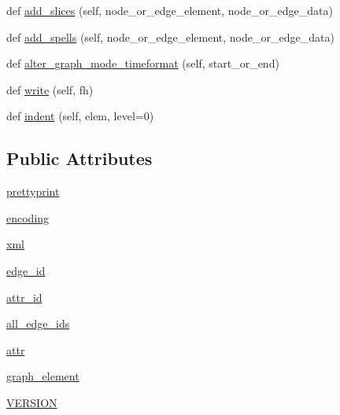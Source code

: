 \begin{DoxyCompactItemize}
\item 
def \hyperlink{classnetworkx_1_1readwrite_1_1gexf_1_1GEXFWriter_adbc9344dbd35d4f1442076ed2bca2ef8}{add\+\_\+slices} (self, node\+\_\+or\+\_\+edge\+\_\+element, node\+\_\+or\+\_\+edge\+\_\+data)
\item 
def \hyperlink{classnetworkx_1_1readwrite_1_1gexf_1_1GEXFWriter_a11e1057e5a3439d8fcd4ee8af8dc81c1}{add\+\_\+spells} (self, node\+\_\+or\+\_\+edge\+\_\+element, node\+\_\+or\+\_\+edge\+\_\+data)
\item 
def \hyperlink{classnetworkx_1_1readwrite_1_1gexf_1_1GEXFWriter_a77c6bf5a63f63976ce7db46a7095521e}{alter\+\_\+graph\+\_\+mode\+\_\+timeformat} (self, start\+\_\+or\+\_\+end)
\item 
def \hyperlink{classnetworkx_1_1readwrite_1_1gexf_1_1GEXFWriter_ac0c34c1a0fd52aaec64bf875f8f7d938}{write} (self, fh)
\item 
def \hyperlink{classnetworkx_1_1readwrite_1_1gexf_1_1GEXFWriter_a6ea8a6fe5b171e23cff80204edb96fe4}{indent} (self, elem, level=0)
\end{DoxyCompactItemize}
\subsection*{Public Attributes}
\begin{DoxyCompactItemize}
\item 
\hyperlink{classnetworkx_1_1readwrite_1_1gexf_1_1GEXFWriter_aea6ac811c3a6b86ad18234f240854620}{prettyprint}
\item 
\hyperlink{classnetworkx_1_1readwrite_1_1gexf_1_1GEXFWriter_a8e076ff772402646ac42b1d8929e96ed}{encoding}
\item 
\hyperlink{classnetworkx_1_1readwrite_1_1gexf_1_1GEXFWriter_a4def131587be3c60e66610a42423e7df}{xml}
\item 
\hyperlink{classnetworkx_1_1readwrite_1_1gexf_1_1GEXFWriter_a8cbecda04292b2f6643167ed26455320}{edge\+\_\+id}
\item 
\hyperlink{classnetworkx_1_1readwrite_1_1gexf_1_1GEXFWriter_aad3ec2eea79af6a38d430bd08a6ee854}{attr\+\_\+id}
\item 
\hyperlink{classnetworkx_1_1readwrite_1_1gexf_1_1GEXFWriter_a81a652562c69a3d024efb890abb0cc48}{all\+\_\+edge\+\_\+ids}
\item 
\hyperlink{classnetworkx_1_1readwrite_1_1gexf_1_1GEXFWriter_aafb1b001d577d9c17a9db06df1d7e217}{attr}
\item 
\hyperlink{classnetworkx_1_1readwrite_1_1gexf_1_1GEXFWriter_afd6ba8266c6d0bf42a86f14d2a5db516}{graph\+\_\+element}
\item 
\hyperlink{classnetworkx_1_1readwrite_1_1gexf_1_1GEXFWriter_a6e2ff94edb6f224eb44ecc6a3ad15d7d}{V\+E\+R\+S\+I\+ON}
\end{DoxyCompactItemize}
